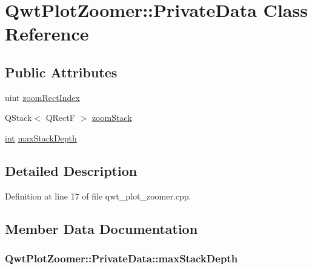 \hypertarget{class_qwt_plot_zoomer_1_1_private_data}{\section{Qwt\-Plot\-Zoomer\-:\-:Private\-Data Class Reference}
\label{class_qwt_plot_zoomer_1_1_private_data}
}
\subsection*{Public Attributes}
\begin{DoxyCompactItemize}
\item 
uint \hyperlink{class_qwt_plot_zoomer_1_1_private_data_aa0586228fab50c47933c87cac90ad6c8}{zoom\-Rect\-Index}
\item 
Q\-Stack$<$ Q\-Rect\-F $>$ \hyperlink{class_qwt_plot_zoomer_1_1_private_data_abc4d63bb7631fcfe6e2e8af2fef8648d}{zoom\-Stack}
\item 
\hyperlink{ioapi_8h_a787fa3cf048117ba7123753c1e74fcd6}{int} \hyperlink{class_qwt_plot_zoomer_1_1_private_data_aae062816e562bb40f211040a5d5b7437}{max\-Stack\-Depth}
\end{DoxyCompactItemize}


\subsection{Detailed Description}


Definition at line 17 of file qwt\-\_\-plot\-\_\-zoomer.\-cpp.



\subsection{Member Data Documentation}
\hypertarget{class_qwt_plot_zoomer_1_1_private_data_aae062816e562bb40f211040a5d5b7437}{
\subsubsection[{max\-Stack\-Depth}]{ Qwt\-Plot\-Zoomer\-::\-Private\-Data\-::max\-Stack\-Depth}}\label{class_qwt_plot_zoomer_1_1_private_data_aae062816e562bb40f211040a5d5b7437}


